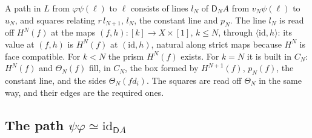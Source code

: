 \documentclass[11pt]{article}
\newcommand{\id}{\mathrm{id}}
\newcommand{\D}{\mathsf{D}}
\theoremstyle{plain}
\theoremstyle{definition}
\theoremstyle{remark}
\begin{document}
A path in $L$ from $\varphi\psi(\ell)$ to $\ell$ consists of lines $l_N$ of
$\D_NA$ from $v_N\psi(\ell)$ to $u_N$, and squares relating $r\,l_{N+1}$,
$l_N$, the constant line and $p_N$. The line $l_N$ is read off $H^N(f)$ at
the maps $(f,h):[k]\to X\times[1]$, $k\le N$, through $\langle\id,h\rangle$:
its value at $(f,h)$ is $H^N(f)$ at $(\id,h)$, natural along strict maps
because $H^N$ is face compatible. For $k<N$ the prism
$H^N(f)$ exists. For $k=N$ it is built in $C_N$: $H^N(f)$ and
$\Theta_N(f)$ fill, in $C_N$, the box formed by $H^{N+1}(f)$, $p_N(f)$, the
constant line, and the sides $\Theta_N(fd_i)$. The squares are read off
$\Theta_N$ in the same way, and their edges are the required ones.

\subsection{The path $\psi\varphi\simeq\id_{\D A}$}
\end{document}
